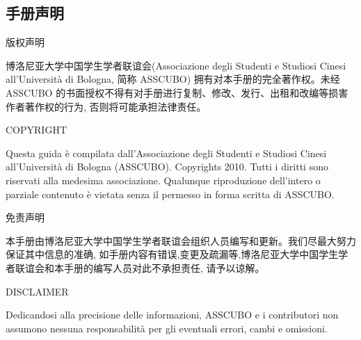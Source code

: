 
\begin{titlepage}                  
% 

\topmargin=-2cm                        %

\chapter*{手册声明}                 %
\pagestyle{empty}%
\thispagestyle{empty} 

\vspace{0.5cm}\centerline{\Large 版权声明}
博洛尼亚大学中国学生学者联谊会(Associazione degli Studenti e Studiosi 
Cinesi all’Università di Bologna, 简称 ASSCUBO) 拥有对本手册的完全著作权。未经 ASSCUBO 的书面授权不得有对手册进行复制、修改、发行、出租和改编等损害作者著作权的行为, 否则将可能承担法律责任。 

\vspace{0.5cm}\centerline{\Large COPYRIGHT}
Questa guida è compilata dall’Associazione degli Studenti e Studiosi Cinesi all’Università di Bologna (ASSCUBO). Copyrights 2010. Tutti i diritti sono riservati alla medesima associazione. Qualunque riproduzione dell’intero o parziale contenuto è vietata senza il permesso in forma scritta di ASSCUBO. 

\vspace{0.5cm}\centerline{\Large 免责声明}
本手册由博洛尼亚大学中国学生学者联谊会组织人员编写和更新。我们尽最大努力保证其中信息的准确, 如手册内容有错误,变更及疏漏等,博洛尼亚大学中国学生学者联谊会和本手册的编写人员对此不承担责任, 请予以谅解。 

\vspace{0.5cm}\centerline{\Large DISCLAIMER}
Dedicandosi alla precisione delle informazioni, ASSCUBO e i contributori non assumono nessuna responsabilità per gli eventuali errori, cambi e omissioni. 


\end{titlepage}
